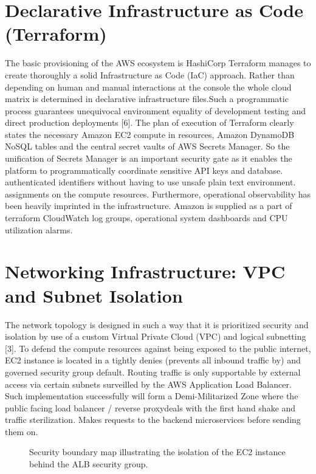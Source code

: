 \documentclass[conference]{IEEEtran}
\begin{document}
\section{Declarative Infrastructure as Code (Terraform)} 
The basic provisioning of the AWS ecosystem is HashiCorp Terraform manages to create thoroughly a solid Infrastructure as Code (IaC) approach. Rather than depending on human and manual interactions at the console the whole cloud matrix is determined in declarative infrastructure files.Such a programmatic process guarantees unequivocal environment equality of development testing and direct production deployments [6]. The plan of execution of Terraform clearly states the necessary Amazon EC2 compute in  resources, Amazon DynamoDB NoSQL tables and the central secret vaults of AWS Secrets Manager. So the unification of Secrets Manager is an important security gate as it enables the platform to programmatically coordinate sensitive API keys and database. authenticated identifiers without having to use unsafe plain text environment. assignments on the compute resources. Furthermore, operational observability has been heavily imprinted in the infrastructure. Amazon is supplied as a part of terraform CloudWatch log groups, operational system dashboards and CPU utilization alarms.

\section{Networking Infrastructure: VPC and Subnet Isolation}
The network topology is designed in such a way that it is prioritized security and isolation by use of a custom Virtual Private Cloud (VPC) and logical subnetting [3]. To defend the compute resources against being exposed to the public internet, EC2 instance is located in a tightly denies (prevents all inbound traffic by) and governed security group default. Routing traffic is only supportable by external access via certain subnets surveilled by the AWS Application Load Balancer. Such implementation successfully will form a Demi-Militarized Zone where the public facing load balancer / reverse proxydeals with the first hand shake and traffic sterilization. Makes requests to the backend microservices before sending them on.

\begin{figure}[t]
\centering
{}
\caption{Security boundary map illustrating the isolation of the EC2 instance behind the ALB security group.}
\label{fig:net_flow}
\end{figure}
\end{document}
